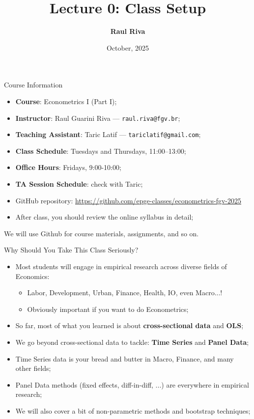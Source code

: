 \documentclass[aspectratio=169, xcolor=dvipsnames, 12pt]{beamer}
\title[]{Lecture 0: Class Setup}
\author{\textbf{Raul Riva}}
\institute{\scriptsize \textcolor{FGVBlue}{FGV EPGE}}
\date{October, 2025}
\begin{document}
\begin{frame}[plain]
  \titlepage
\end{frame}

\begin{frame}{Course Information}
  \begin{itemize}
    \item \textbf{Course}: Econometrics I (Part I);
    \item \textbf{Instructor}: Raul Guarini Riva — \texttt{raul.riva@fgv.br};
    \item \textbf{Teaching Assistant}: Taric Latif — \texttt{tariclatif@gmail.com};
    \item \textbf{Class Schedule}: Tuesdays and Thursdays, 11:00–13:00;
    \item \textbf{Office Hours}: Fridays, 9:00-10:00;
    \item \textbf{TA Session Schedule}: check with Taric;
    \item GitHub repository: \url{https://github.com/epge-classes/econometrics-fgv-2025}
    \item After class, you should review the online syllabus in detail;
  \end{itemize}
  \vspace{1em}
  \centering
  \alert{We will use Github for course materials, assignments, and so on.}
\end{frame}

\begin{frame}{Why Should You Take This Class Seriously?}
  \begin{itemize}
    \item Most students will engage in empirical research across diverse fields of Economics:
      \begin{itemize}
        \item Labor, Development, Urban, Finance, Health, IO, even Macro...!
        \item Obviously important if you want to do Econometrics;
      \end{itemize}
    \item So far, most of what you learned is about \textbf{cross-sectional data} and \textbf{OLS};
    \item We go beyond cross-sectional data to tackle: \textbf{Time Series} and \textbf{Panel Data};
    \item Time Series data is your bread and butter in Macro, Finance, and many other fields;
    \item Panel Data methods (fixed effects, diff-in-diff, ...) are everywhere in empirical research;
    \item We will also cover a bit of non-parametric methods and bootstrap techniques;
  \end{itemize}
\end{frame}
\end{document}
